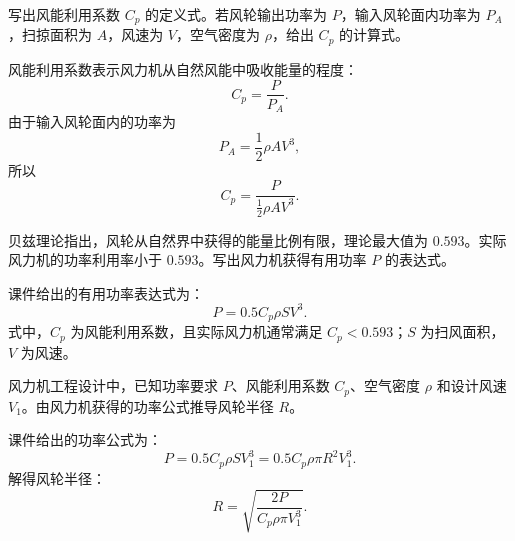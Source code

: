 \begin{problem}[风能利用系数]\label{exer:calc_03_wind_p066_01}
写出风能利用系数 \(C_p\) 的定义式。若风轮输出功率为 \(P\)，输入风轮面内功率为 \(P_A\)，扫掠面积为 \(A\)，风速为 \(V\)，空气密度为 \(\rho\)，给出 \(C_p\) 的计算式。
\end{problem}

\begin{solution}
风能利用系数表示风力机从自然风能中吸收能量的程度：
\begin{equation}
C_p = \frac{P}{P_A}.
\end{equation}
由于输入风轮面内的功率为
\begin{equation}
P_A = \frac{1}{2}\rho A V^3,
\end{equation}
所以
\begin{equation}
C_p
= \frac{P}{\frac{1}{2}\rho A V^3}.
\end{equation}
\end{solution}

\begin{problem}[贝兹极限与有用功率]\label{exer:calc_03_wind_p074_01}
贝兹理论指出，风轮从自然界中获得的能量比例有限，理论最大值为 \(0.593\)。实际风力机的功率利用率小于 \(0.593\)。写出风力机获得有用功率 \(P\) 的表达式。
\end{problem}

\begin{solution}
课件给出的有用功率表达式为：
\begin{equation}
P = 0.5 C_p \rho S V^3.
\end{equation}
式中，\(C_p\) 为风能利用系数，且实际风力机通常满足 \(C_p < 0.593\)；\(S\) 为扫风面积，\(V\) 为风速。
\end{solution}

\begin{problem}[由目标功率反推风轮半径]\label{exer:calc_03_wind_p079_01}
风力机工程设计中，已知功率要求 \(P\)、风能利用系数 \(C_p\)、空气密度 \(\rho\) 和设计风速 \(V_1\)。由风力机获得的功率公式推导风轮半径 \(R\)。
\end{problem}

\begin{solution}
课件给出的功率公式为：
\begin{equation}
P = 0.5 C_p \rho S V_1^3
  = 0.5 C_p \rho \pi R^2 V_1^3.
\end{equation}
解得风轮半径：
\begin{equation}
R = \sqrt{\frac{2P}{C_p\rho\pi V_1^3}}.
\end{equation}
\end{solution}


